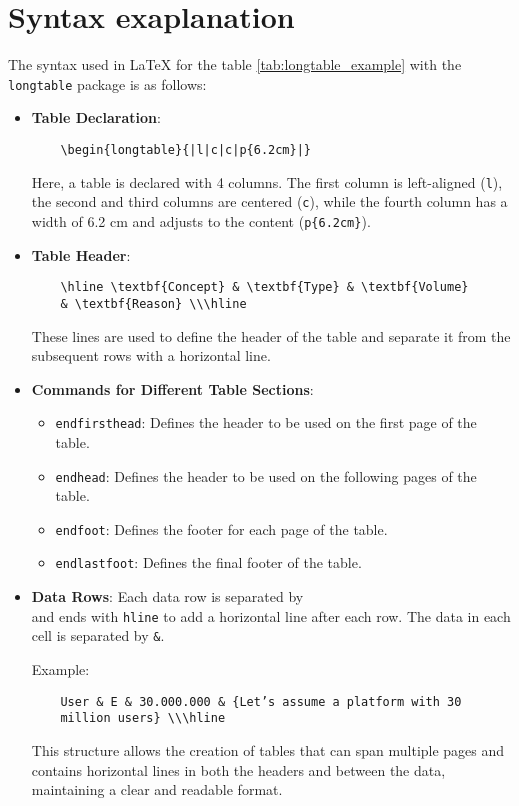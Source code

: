 \section{Syntax exaplanation}
The syntax used in LaTeX for the table \ref{tab:longtable_example} with the \texttt{longtable} package is as follows:

\begin{itemize}
    \item \textbf{Table Declaration}:
    \begin{verbatim}
    \begin{longtable}{|l|c|c|p{6.2cm}|}
    \end{verbatim}
    Here, a table is declared with 4 columns. The first column is left-aligned (\texttt{l}), the second and third columns are centered (\texttt{c}), while the fourth column has a width of 6.2 cm and adjusts to the content (\texttt{p\{6.2cm\}}).

    \item \textbf{Table Header}:
    \begin{verbatim}
    \hline \textbf{Concept} & \textbf{Type} & \textbf{Volume}
    & \textbf{Reason} \\\hline
    \end{verbatim}
    These lines are used to define the header of the table and separate it from the subsequent rows with a horizontal line.

    \item \textbf{Commands for Different Table Sections}:
    \begin{itemize}
        \item \texttt{endfirsthead}: Defines the header to be used on the first page of the table.
        \item \texttt{endhead}: Defines the header to be used on the following pages of the table.
        \item \texttt{endfoot}: Defines the footer for each page of the table.
        \item \texttt{endlastfoot}: Defines the final footer of the table.
    \end{itemize}

    \item \textbf{Data Rows}:
    Each data row is separated by \texttt{\\} and ends with \texttt{hline} to add a horizontal line after each row. The data in each cell is separated by \texttt{\&}.

    Example:
    \begin{verbatim}
    User & E & 30.000.000 & {Let’s assume a platform with 30
    million users} \\\hline
    \end{verbatim}







    This structure allows the creation of tables that can span multiple pages and contains horizontal lines in both the headers and between the data, maintaining a clear and readable format.
\end{itemize}

